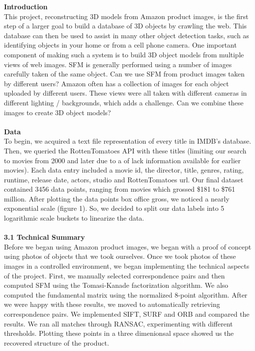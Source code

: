 \documentclass[12pt]{article}
\begin{document}
\begin{multicols}{2}
{\noindent \large \textbf{Introduction}}\\
This project, reconstructing 3D models from Amazon product images, is the first step of a larger goal to build a database of 3D objects by crawling the web.  This database can then be used to assist in many other object detection tasks, such as identifying objects in your home or from a cell phone camera.  One important component of making such a system is to build 3D object models from multiple views of web images. SFM is generally performed using a number of images carefully taken of the same object.  Can we use SFM from product images taken by different users?  Amazon often has a collection of images for each object uploaded by different users.  These views were all taken with different cameras in different lighting / backgrounds, which adds a challenge.  Can we combine these images to create 3D object models?
\\\\
{\large \textbf{Data}}\\
To begin, we acquired a text file representation of every title in IMDB’s database. Then, we queried the RottenTomatoes API with these titles (limiting our search to movies from 2000 and later due to a of lack information available for earlier movies). Each data entry included a movie id, the director, title, genres, rating, runtime, release date, actors, studio and RottenTomatoes url. Our final dataset contained 3456 data points, ranging from movies which grossed \$181 to \$761 million. After plotting the data points box office gross, we noticed a nearly exponential scale (figure 1). So, we decided to split our data labels into 5 logarithmic scale buckets to linearize the data.\\\\
{\large \textbf{3.1 Technical Summary}}\\
Before we began using Amazon product images, we began with a proof of concept using photos of objects that we took ourselves. Once we took photos of these images in a controlled environment, we began implementing the technical aspects of the project. First, we manually selected correspondence pairs and then computed SFM using the Tomasi-Kanade factorization algorithm. We also computed the fundamental matrix using the normalized 8-point algorithm. After we were happy with these results, we moved to automatically retrieving correspondence pairs. We implemented SIFT, SURF and ORB and compared the results. We ran all matches through RANSAC, experimenting with different thresholds. Plotting these points in a three dimenionsal space showed us the recovered structure of the product. 



\end{multicols}
\end{document}
